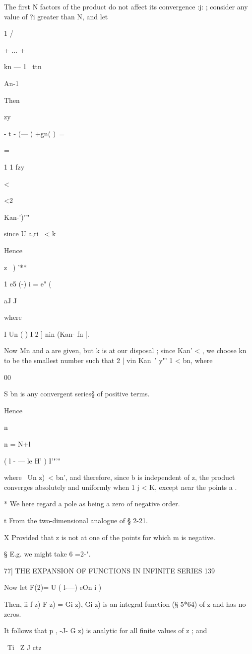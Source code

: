 The first N factors of the product do not affect its convergence :j: ;
consider any value of ?i greater than N, and let

1 /

+ ... +

kn — 1 \ ttn

An-1

Then

zy

- t - (— ) +gn( )\ =

=

1 1 fzy

<

<2\ \ {Kan-')''"\,

since U a,ri \ < k

Hence

z \ ) '**

1 e5 (-) i = e" (

aJ J

where

I Un ( ) I 2 ] nin (Kan- fn |.

Now Mn and a are given, but k is at our disposal ; since Kan' < , we
choose kn to be the smallest number such that 2 | vin Kan~' y"' 1 <
bn, where

00

S bn is any convergent series§ of positive terms.

Hence

n

n = N+l

 ( l - — le H' ) I'"'"

where \ Un z)\ < bn', and therefore, since b is independent of z, the
product converges absolutely and uniformly when 1 j < K, except near
the points a .

* We here regard a pole as being a zero of negative order.

t From the two-dimensional analogue of § 2-21.

X Provided that z is not at one of the points for which m is negative.

§ E.g. we might take 6 =2-".

77] THE EXPANSION OF FUNCTIONS IN INFINITE SERIES 139

Now let F(2)= U ( l-—) eOn i )

Then, ii f z) F z) = Gi z), Gi z) is an integral function (§ 5*64) of
z and has no zeros.

It follows that p , -J- G z) is analytic for all finite values of z ;
and

\ Ti \ Z J ctz

}
